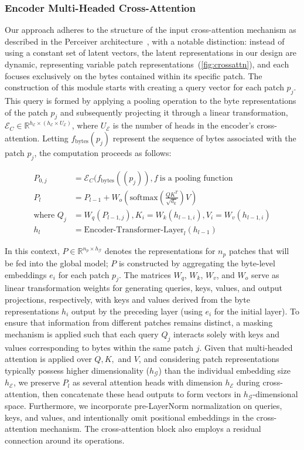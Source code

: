 \subsubsection{Encoder Multi-Headed Cross-Attention}
\label{sec:enc-cross-attn}
Our approach adheres to the structure of the input cross-attention mechanism as described in the Perceiver architecture~\citep{jaegle2021perceiver}, with a notable distinction: instead of using a constant set of latent vectors, the latent representations in our design are dynamic, representing variable patch representations~(\autoref{fig:crossattn}), and each focuses exclusively on the bytes contained within its specific patch. The construction of this module starts with creating a query vector for each patch $p_j$. This query is formed by applying a pooling operation to the byte representations of the patch $p_j$ and subsequently projecting it through a linear transformation, $\mathcal{E}_{C} \in \mathbb{R}^{h_{\mathcal{E}} \times (h_{\mathcal{E}} \times U_{\mathcal{E}})}$, where $U_{\mathcal{E}}$ is the number of heads in the encoder's cross-attention. Letting $f_{\text{bytes}}(p_j)$ represent the sequence of bytes associated with the patch $p_j$, the computation proceeds as follows:

\begin{align}
P_{0,j} &= \mathcal{E}_{C}(f_\text{bytes}((p_j)), f~ \text{is a pooling function} \\
P_l &= P_{l-1} + W_o\left(\text{softmax}\left(\frac{QK^T}{\sqrt{d_k}}\right)V\right) \\
\text{where } Q_j &= W_q(P_{l-1,j}), K_i = W_k(h_{l-1,i}), V_i = W_v(h_{l-1,i}) \\
h_l &= \text{Encoder-Transformer-Layer}_l(h_{l-1})
\end{align}

In this context, $P \in \mathbb{R}^{n_p \times h_{\mathcal{G}}}$ denotes the representations for $n_p$ patches that will be fed into the global model; $P$ is constructed by aggregating the byte-level embeddings $e_i$ for each patch $p_j$. The matrices $W_q$, $W_k$, $W_v$, and $W_o$ serve as linear transformation weights for generating queries, keys, values, and output projections, respectively, with keys and values derived from the byte representations $h_i$ output by the preceding layer (using $e_i$ for the initial layer). To ensure that information from different patches remains distinct, a masking mechanism is applied such that each query $Q_j$ interacts solely with keys and values corresponding to bytes within the same patch $j$. Given that multi-headed attention is applied over $Q, K,$ and $V$, and considering patch representations typically possess higher dimensionality ($h_{\mathcal{G}}$) than the individual embedding size $h_{\mathcal{E}}$, we preserve $P_l$ as several attention heads with dimension $h_{\mathcal{E}}$ during cross-attention, then concatenate these head outputs to form vectors in $h_{\mathcal{G}}$-dimensional space. Furthermore, we incorporate pre-LayerNorm normalization on queries, keys, and values, and intentionally omit positional embeddings in the cross-attention mechanism. The cross-attention block also employs a residual connection around its operations.

